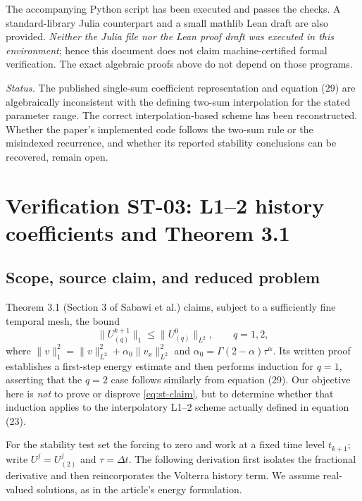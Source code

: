 \documentclass[11pt,a4paper]{amsart}
\theoremstyle{remark}
\theoremstyle{plain}
\theoremstyle{remark}
\numberwithin{equation}{section}
\begin{document}
The accompanying Python script has been executed and passes the checks. A standard-library Julia counterpart and a small mathlib Lean draft are also provided. \emph{Neither the Julia file nor the Lean proof draft was executed in this environment}; hence this document does not claim machine-certified formal verification. The exact algebraic proofs above do not depend on those programs.

\noindent\textit{Status.} The published single-sum coefficient representation and equation (29) are algebraically inconsistent with the defining two-sum interpolation for the stated parameter range. The correct interpolation-based scheme has been reconstructed. Whether the paper's implemented code follows the two-sum rule or the misindexed recurrence, and whether its reported stability conclusions can be recovered, remain open.


\section{Verification ST-03: L1--2 history coefficients and Theorem 3.1}
\label{sec:stability-audit}

\subsection{Scope, source claim, and reduced problem}
Theorem 3.1 (Section 3 of Sabawi et al.) claims, subject to a sufficiently fine temporal mesh, the bound
\begin{equation}\label{eq:st-claim}
 \|U_{(q)}^{k+1}\|_1\leq\|U_{(q)}^0\|_{L^2},\qquad q=1,2,
\end{equation}
where $\|v\|_1^2=\|v\|_{L^2}^2+\alpha_0\|v_x\|_{L^2}^2$ and $\alpha_0=\Gamma(2-\alpha)\tau^\alpha$. Its written proof establishes a first-step energy estimate and then performs induction for $q=1$, asserting that the $q=2$ case follows similarly from equation (29). Our objective here is \emph{not} to prove or disprove \eqref{eq:st-claim}, but to determine whether that induction applies to the interpolatory L1--2 scheme actually defined in equation (23).

For the stability test set the forcing to zero and work at a fixed time level $t_{k+1}$; write $U^j=U_{(2)}^j$ and $\tau=\Delta t$. The following derivation first isolates the fractional derivative and then reincorporates the Volterra history term. We assume real-valued solutions, as in the article's energy formulation.
\end{document}

